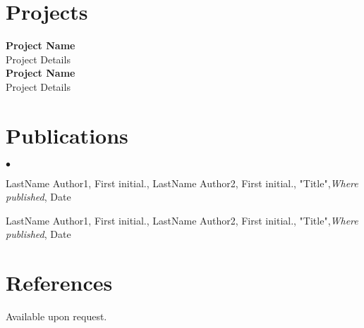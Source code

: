 \documentclass[margin,line]{res}
\newenvironment{list2}{
  \begin{list}{$\bullet$}{%
      \setlength{\itemsep}{0in}
      \setlength{\parsep}{0in} \setlength{\parskip}{0in}
      \setlength{\topsep}{0in} \setlength{\partopsep}{0in}
      \setlength{\leftmargin}{0.2in}}}{\end{list}}
\begin{document}
\begin{resume}
\section{\sc Projects}
{\bf Project Name}\\
Project Details\\

{\bf Project Name}\\
Project Details\\

\section{\sc Publications}

\begin{list2}
\item LastName Author1, First initial., LastName Author2, First initial.,  "Title",{\em Where published}, Date
\item LastName Author1, First initial., LastName Author2, First initial.,  "Title",{\em Where published}, Date
\end{list2}


\section{\sc References }
Available upon request.


\end{resume}
\end{document}
